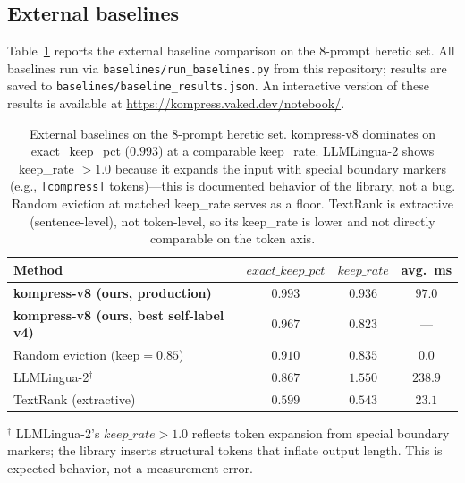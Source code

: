 \subsection{External baselines}
\label{sec:baselines}

Table~\ref{tab:baselines} reports the external baseline comparison on the
8-prompt heretic set. All baselines run via
\texttt{baselines/run\_baselines.py} from this repository; results are saved
to \texttt{baselines/baseline\_results.json}. An interactive version of these
results is available at
\url{https://kompress.vaked.dev/notebook/}.

\begin{table}[h]
\centering
\caption{External baselines on the 8-prompt heretic set. kompress-v8
dominates on exact\_keep\_pct ($0.993$) at a comparable keep\_rate. LLMLingua-2
shows keep\_rate $>1.0$ because it expands the input with special boundary
markers (e.g., \texttt{[compress]} tokens)---this is documented behavior of
the library, not a bug. Random eviction at matched keep\_rate serves as a
floor. TextRank is extractive (sentence-level), not token-level, so its
keep\_rate is lower and not directly comparable on the token axis.}
\label{tab:baselines}
\begin{tabular}{lccc}
\toprule
Method & $\mathit{exact\_keep\_pct}$ & $\mathit{keep\_rate}$ & avg.\ ms \\
\midrule
\textbf{kompress-v8 (ours, production)} & $\mathbf{0.993}$ & $0.936$ & $97.0$ \\
\textbf{kompress-v8 (ours, best self-label v4)} & $\mathbf{0.967}$ & $0.823$ & --- \\
\midrule
Random eviction (keep$=0.85$) & $0.910$ & $0.835$ & $0.0$ \\
LLMLingua-2$^\dagger$          & $0.867$ & $1.550$ & $238.9$ \\
TextRank (extractive)         & $0.599$ & $0.543$ & $23.1$ \\
\bottomrule
\end{tabular}

\smallskip
$^\dagger$ LLMLingua-2's $\mathit{keep\_rate} > 1.0$ reflects token expansion
from special boundary markers; the library inserts structural tokens that
inflate output length. This is expected behavior, not a measurement error.
\end{table}

